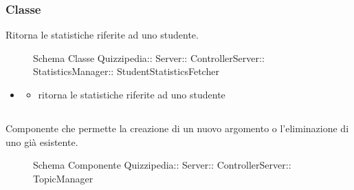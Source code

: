 \subsubsection{Classe }
Ritorna le statistiche riferite ad uno studente.
\begin{figure}[H]
\centering
\noindent{}
\caption[Schema Classe StudentStatisticsFetcher]{Schema Classe Quizzipedia:: Server:: ControllerServer:: StatisticsManager:: StudentStatisticsFetcher}
\end{figure}
\begin{itemize}
\item {}
\begin{itemize}
\item {}
\newline
ritorna le statistiche riferite ad uno studente
\newline
\end{itemize}
\end{itemize}
\subsection{}
Componente che permette la creazione di un nuovo argomento o l'eliminazione di uno già esistente.
\begin{figure}[H]
\centering
\noindent{}
\caption[Schema Componente TopicManager]{Schema Componente Quizzipedia:: Server:: ControllerServer:: TopicManager}
\end{figure}
